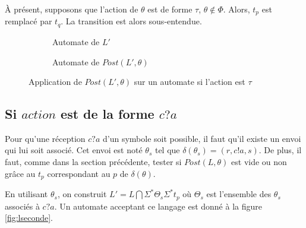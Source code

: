 À présent, supposons que l'action de $\theta$ est de forme $\tau$, $\theta\notin\Phi$. Alors, $t_p$ est remplacé par $t_q$. La transition est alors sous-entendue.

\begin{figure}[H]
    \centering
    \begin{subfigure}{0.5\linewidth}
        \centering
        \caption{Automate de $L'$}
    \end{subfigure}\hfill
    \begin{subfigure}{0.5\linewidth}
        \centering
        \caption{Automate de $Post(L',\theta)$}
    \end{subfigure}
    \caption{Application de $Post(L',\theta)$ sur un automate si l'action est $\tau$}
\end{figure}


\subsection{Si $action$ est de la forme $c?a$}

Pour qu'une réception $c?a$ d'un symbole soit possible, il faut qu'il existe un envoi qui lui soit associé. Cet envoi est noté $\theta_s$ tel que $\delta(\theta_s)=(r,c!a,s)$. De plus, il faut, comme dans la section précédente, tester si $Post(L,\theta)$ est vide ou non grâce au $t_p$ correspondant au $p$ de $\delta(\theta)$.

En utilisant $\theta_s$, on construit $L'=L\bigcap\Sigma^*\Theta_s\Sigma^*t_p$ où $\Theta_s$ est l'ensemble des $\theta_s$ associés à $c?a$. Un automate acceptant ce langage est donné à la figure \ref{fig:lseconde}.

